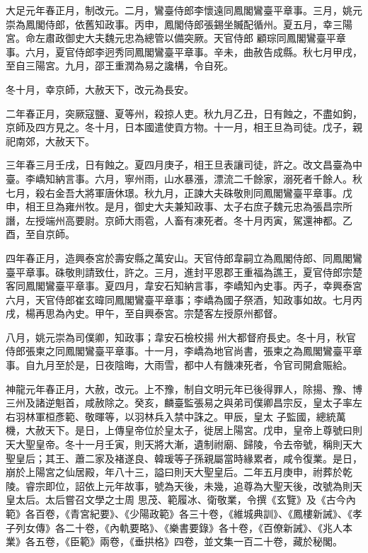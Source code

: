 \begin{pinyinscope}
 大足元年春正月，制改元。二月，鸞臺侍郎李懷遠同鳳閣鸞臺平章事。三月，姚元崇為鳳閣侍郎，依舊知政事。丙申，鳳閣侍郎張錫坐贓配循州。夏五月，幸三陽宮。命左肅政御史大夫魏元忠為總管以備突厥。天官侍郎
 顧琮同鳳閣鸞臺平章事。六月，夏官侍郎李迥秀同鳳閣鸞臺平章事。辛未，曲赦告成縣。秋七月甲戌，至自三陽宮。九月，邵王重潤為易之讒構，令自死。



 冬十月，幸京師，大赦天下，改元為長安。



 二年春正月，突厥寇鹽、夏等州，殺掠人吏。秋九月乙丑，日有蝕之，不盡如鉤，京師及四方見之。冬十月，日本國遣使貢方物。十一月，相王旦為司徒。戊子，親祀南郊，大赦天下。



 三年春三月壬戌，日有蝕之。夏四月庚子，相王旦表讓司徒，許之。改文昌臺為中臺。李嶠知納言事。六月，寧州雨，山水暴漲，漂流二千餘家，溺死者千餘人。秋七月，殺右金吾大將軍唐休璟。秋九月，正諫大夫硃敬則同鳳閣鸞臺平章事。戊申，相王旦為雍州牧。是月，御史大夫兼知政事、太子右庶子魏元忠為張昌宗所譖，左授端州高要尉。京師大雨雹，人畜有凍死者。冬十月丙寅，駕還神都。乙酉，至自京師。



 四年春正月，造興泰宮於壽安縣之萬安山。天官侍郎韋嗣立為鳳閣侍郎、同鳳閣鸞臺平章事。硃敬則請致仕，許之。三月，進封平恩郡王重福為譙王，夏官侍郎宗楚客同鳳閣鸞臺平章事。夏四月，韋安石知納言事，李嶠知內史事。丙子，幸興泰宮六月，天官侍郎崔玄暐同鳳閣鸞臺平章事；李嶠為國子祭酒，知政事如故。七月丙戌，楊再思為內史。甲午，至自興泰宮。宗楚客左授原州都督。



 八月，姚元崇為司僕卿，知政事；韋安石檢校揚
 州大都督府長史。冬十月，秋官侍郎張柬之同鳳閣鸞臺平章事。十一月，李嶠為地官尚書，張柬之為鳳閣鸞臺平章事。自九月至於是，日夜陰晦，大雨雪，都中人有饑凍死者，令官司開倉賑給。



 神龍元年春正月，大赦，改元。上不豫，制自文明元年已後得罪人，除揚、豫、博三州及諸逆魁首，咸赦除之。癸亥，麟臺監張易之與弟司僕卿昌宗反，皇太子率左右羽林軍桓彥範、敬暉等，以羽林兵入禁中誅之。甲辰，皇太
 子監國，總統萬機，大赦天下。是日，上傳皇帝位於皇太子，徙居上陽宮。戊申，皇帝上尊號曰則天大聖皇帝。冬十一月壬寅，則天將大漸，遺制祔廟、歸陵，令去帝號，稱則天大聖皇后；其王、蕭二家及褚遂良、韓瑗等子孫親屬當時緣累者，咸令復業。是日，崩於上陽宮之仙居殿，年八十三，謚曰則天大聖皇后。二年五月庚申，祔葬於乾陵。睿宗即位，詔依上元年故事，號為天後，未幾，追尊為大聖天後，改號為則天皇太后。太后嘗召文學之士周
 思茂、範履冰、衛敬業，令撰《玄覽》及《古今內範》各百卷，《青宮紀要》、《少陽政範》各三十卷，《維城典訓》、《鳳樓新誡》、《孝子列女傳》各二十卷，《內軌要略》、《樂書要錄》各十卷，《百僚新誡》、《兆人本業》各五卷，《臣範》兩卷，《垂拱格》四卷，並文集一百二十卷，藏於秘閣。




\end{pinyinscope}
